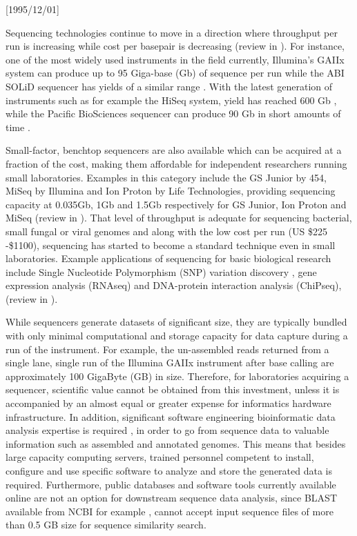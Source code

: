 \NeedsTeXFormat{LaTeX2e}[1995/12/01] \documentclass[10pt]{bmc_article}
\newenvironment{bmcformat}{\begin{raggedright}\baselineskip20pt\sloppy\setboolean{publ}{false}}{\end{raggedright}\baselineskip20pt\sloppy}
\begin{document}
\begin{bmcformat}
Sequencing technologies continue to move in a direction where throughput per run is increasing while cost
per basepair is decreasing (review in \cite{Mason2012}). For instance, one of the most widely used instruments 
in the field currently, Illumina's GAIIx system can produce up to 95 Giga-base (Gb) of sequence per run \cite{Illumina} 
while the ABI SOLiD sequencer has yields of a similar range \cite{solid5500}. With the latest generation of 
instruments such as for example the HiSeq system, yield has reached 600 Gb \cite{Illumina}, while the Pacific 
BioSciences sequencer can produce 90 Gb in short amounts of time \cite{PacBio}.  \pb

Small-factor, benchtop sequencers are also available which can be acquired at a fraction of the cost, making them 
affordable for independent researchers running small laboratories. Examples in this category
include the GS Junior by 454, MiSeq by Illumina and Ion Proton by Life Technologies, providing sequencing 
capacity at 0.035Gb, 1Gb and 1.5Gb respectively for GS Junior, Ion Proton and MiSeq (review in \cite{Loman2012a}). 
That level of throughput is adequate for sequencing bacterial, small fungal or viral genomes and along with the
low cost per run (US \$225 -\$1100), sequencing has started to become a standard technique even in small laboratories.  
Example applications of sequencing for basic biological research include Single Nucleotide Polymorphism 
(SNP) variation discovery , gene expression analysis (RNAseq) and DNA-protein interaction analysis
(ChiPseq), (review in \cite{Mardis2008}). \pb

While sequencers generate datasets of significant size, they are typically bundled with only minimal computational and 
storage capacity for data capture during a run of the instrument.  For example, the un-assembled reads
returned from a single lane, single run of the Illumina GAIIx instrument after base calling are approximately 100 GigaByte
(GB) in size. Therefore, for laboratories acquiring a sequencer, scientific value cannot be obtained 
from this investment, unless it is accompanied by an almost equal or greater expense for informatics hardware 
infrastructure. In addition, significant software engineering bioinformatic data analysis expertise is required 
\cite{gogol2012overview}, in order to go from sequence data to valuable information such as assembled and 
annotated genomes. This means that besides large capacity computing servers, trained personnel competent to install, 
configure and use specific software to analyze and store  the generated data is required. Furthermore, public databases 
and software tools currently available online are not an option for downstream sequence data analysis, since 
BLAST \cite{altschul1990basic} available from NCBI for example \cite{johnson2008ncbi}, cannot accept input 
sequence files of more  than 0.5 GB  size for sequence similarity search.  \pb


\end{bmcformat}
\end{document}
